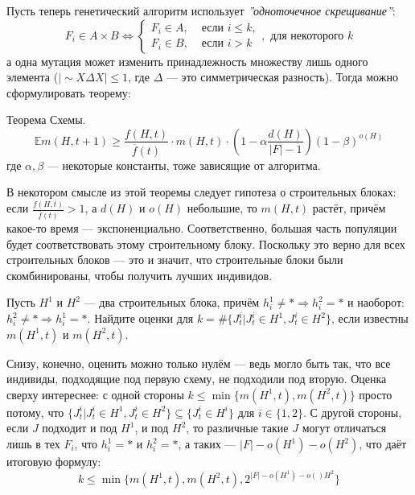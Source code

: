 Пусть теперь генетический алгоритм использует \textit{''одноточечное скрещивание''}: $$F_i \in A \times B \Leftrightarrow \begin{cases}
        F_i \in A, & \text{ если } i \leqslant k, \\
        F_i \in B, & \text{ если } i > k
    \end{cases}, \textit{ для некоторого } k$$
а одна мутация может изменить принадлежность множеству лишь одного элемента ($|\sim X \Delta X| \leqslant 1$, где $\Delta$ --- это симметрическая разность).
Тогда можно сформулировать теорему:
\begin{theorem}
    Теорема Схемы.
    $$\mathbb{E}m(H, t + 1) \geqslant \frac{f(H, t)}{\overline{f}(t)}\cdot m(H, t)\cdot\left(1 - \alpha\frac{d(H)}{|F| - 1}\right)(1 - \beta)^{o(H)}$$
    где $\alpha, \beta$ --- некоторые константы, тоже зависящие от алгоритма.
\end{theorem}

\begin{corollary}
    В некотором смысле из этой теоремы следует гипотеза о строительных блоках: если $\frac{f(H, t)}{\overline{f}(t)} > 1$, а $d(H)$ и $o(H)$ небольшие, то $m(H, t)$ растёт, причём какое-то время --- экспоненциально. Соответственно, большая часть популяции будет соответствовать этому строительному блоку. Поскольку это верно для всех строительных блоков --- это и значит, что строительные блоки были скомбинированы, чтобы получить лучших индивидов.
\end{corollary}

\begin{problem}
Пусть $H^1$ и $H^2$ --- два строительных блока, причём $h^1_i \neq * \Rightarrow h^2_i = *$ и наоборот: $h^2_i \neq * \Rightarrow h^1_i = *$. Найдите оценки для $k = \#\{J_t^i| J_t^i \in H^1, J_t^i \in H^2\}$, если известны $m(H^1, t)$ и $m(H^2, t)$.
\end{problem}
\begin{solution}
    Снизу, конечно, оценить можно только нулём --- ведь могло быть так, что все индивиды, подходящие под первую схему, не подходили под вторую. Оценка сверху интереснее: с одной стороны $k \leqslant \min\{m(H^1, t), m(H^2, t)\}$ просто потому, что $\{J_t^i| J_t^i \in H^1, J_t^i \in H^2\} \subseteq \{J_t^i \in H^i\}$ для $i \in \{1, 2\}$. С другой стороны, если $J$ подходит и под $H^1$, и под $H^2$, то различные такие $J$ могут отличаться лишь в тех $F_i$, что $h_i^1 = *$ и $h_i^2 = *$, а таких --- $|F| - o(H^1) - o(H^2)$, что даёт итоговую формулу:
    $$k \leqslant \min\{m(H^1, t), m(H^2, t), 2^{|F| - o(H^1) - o()H^2}\}$$
\end{solution}


